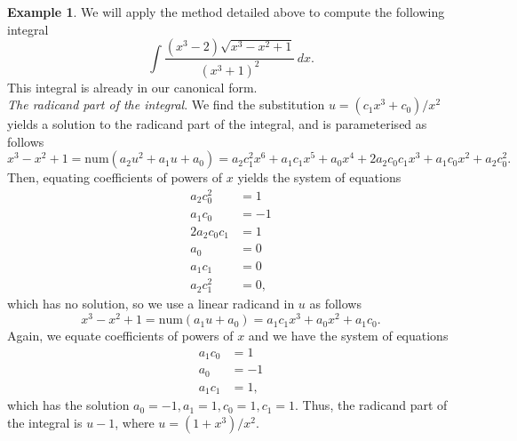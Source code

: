 \documentclass[12pt]{article}
\numberwithin{equation}{section}
\theoremstyle{definition}
\newtheorem{example}{Example}[section]
\begin{document}
\begin{example}
We will apply the method detailed above to compute the following integral
$$\int \frac{\left(x^3-2\right) \sqrt{x^3-x^2+1}}{\left(x^3+1\right)^2} \, dx.$$ 
This integral is already in our canonical form. \\

\noindent\textit{The radicand part of the integral}. We find the substitution 
$u=\left(c_1 x^3+c_0\right)/x^2$ yields a solution to the radicand part of the 
integral, and is parameterised as follows
$$x^3-x^2+1 = \text{num}\left( a_2u^2+a_1u+a_0 \right) = 
	a_2 c_1^2 x^6 + a_1 c_1 x^5 + a_0 x^4 + 2 a_2 c_0 c_1 x^3 + a_1 c_0 x^2 + a_2 c_0^2.$$
Then, equating coefficients of powers of $x$ yields the system of equations
\begin{align*}
 a_2 c_0^2 &= 1\\
 a_1 c_0 &= -1\\
 2 a_2 c_0 c_1 &= 1\\
 a_0 &= 0\\
 a_1 c_1 &= 0\\
 a_2 c_1^2 &= 0,
\end{align*}
which has no solution, so we use a linear radicand in $u$ as follows 
$$x^3-x^2+1 = \text{num}\left( a_1u + a_0 \right) = a_1 c_1 x^3 + a_0 x^2 + a_1 c_0.$$
Again, we equate coefficients of powers of $x$ and we have the system of equations
\begin{align*}
 a_1 c_0 &= 1\\
 a_0 &= -1\\
 a_1 c_1 &= 1,
\end{align*}
which has the solution $a_0 = -1, a_1 = 1, c_0 = 1, c_1 = 1$. Thus, the radicand part of the 
integral is $u-1$, where $u=\left(1+x^3\right)/x^2$. \\


\end{example}
\end{document}
